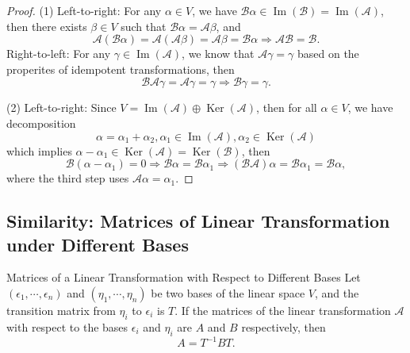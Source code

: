 \begin{proof}
  (1) Left-to-right: For any $\alpha \in V$,
  we have $\mathcal{B} \alpha \in \operatorname{Im}(\mathcal{B}) =
  \operatorname{Im}(\mathcal{A})$, then there exists $\beta \in V$ such that
  $\mathcal{B}\alpha = \mathcal{A} \beta$, and
  \begin{equation}
    \mathcal{A}(\mathcal{B}\alpha) = \mathcal{A} (\mathcal{A}\beta) = \mathcal{A} \beta
    = \mathcal{B} \alpha \Rightarrow \mathcal{A} \mathcal{B} = \mathcal{B}.
  \end{equation}
  Right-to-left: For any $\gamma \in \operatorname{Im}(\mathcal{A})$,
  we know that $\mathcal{A} \gamma = \gamma$ based on the properites of
  idempotent transformations, then
  \begin{equation}
  \mathcal{B} \mathcal{A} \gamma = \mathcal{A} \gamma = \gamma \Rightarrow \mathcal{B} \gamma = \gamma.
  \end{equation}

  (2) Left-to-right: Since $V = \operatorname{Im}(\mathcal{A}) \oplus
  \operatorname{Ker}(\mathcal{A})$,
  then for all $\alpha \in V$, we have decomposition
  \begin{equation}
    \alpha = \alpha_1 + \alpha_2, \alpha_1 \in \operatorname{Im}(\mathcal{A}), \alpha_2 \in \operatorname{Ker}(\mathcal{A})
  \end{equation}
  which implies $\alpha - \alpha_1 \in \operatorname{Ker}(\mathcal{A}) =
  \operatorname{Ker}(\mathcal{B})$, then
  \begin{equation}
    \mathcal{B}(\alpha - \alpha_1) = 0 \Rightarrow \mathcal{B}\alpha = \mathcal{B}\alpha_1 \Rightarrow
    (\mathcal{B}\mathcal{A})\alpha = \mathcal{B} \alpha_1 = \mathcal{B} \alpha,
  \end{equation}
  where the third step uses $\mathcal{A} \alpha = \alpha_1$.
\end{proof}

\subsection{Similarity: Matrices of Linear Transformation under Different Bases}

\begin{theorem}{Matrices of a Linear Transformation with Respect to Different Bases}{}
  Let $(\epsilon_1,\cdots,\epsilon_n)$ and $(\eta_1,\cdots,\eta_n)$ be two bases
  of the linear space $V$,
  and the transition matrix from $\eta_i$ to $\epsilon_i$ is $T$.
  If the matrices of the linear transformation $\mathcal{A}$ with respect to the
  bases $\epsilon_i$ and $\eta_i$ are $A$ and $B$ respectively, then
  \begin{equation}
    A = T^{-1}BT.
  \end{equation}
\end{theorem}

